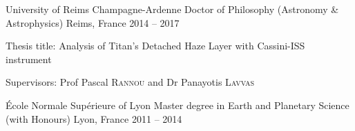 
\begin{cventries}

  \cventry
    {University of Reims Champagne-Ardenne}
    {Doctor of Philosophy (Astronomy \& Astrophysics)}
    {Reims, France}
    {2014 -- 2017}
    {
      \begin{cvitems}
        \item{Thesis title: Analysis of Titan’s Detached Haze Layer with Cassini-ISS instrument}
        \item{Supervisors: Prof Pascal \textsc{Rannou} and Dr Panayotis \textsc{Lavvas}}
      \end{cvitems}
      \vspace{1em}
    }

  \cventry
    {École Normale Supérieure of Lyon}
    {Master degree in Earth and Planetary Science (with Honours)}
    {Lyon, France}
    {2011 -- 2014}
    {}

\end{cventries}
